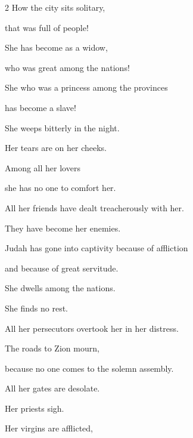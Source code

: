 




\vspace{-1.36in}

\begin{multicols}{2}
	\raggedcolumns
	\mychapter{} \myverse*{}How the city sits solitary,
	
	that was full of people!
	
	She has become as a widow,
	
	who was great among the nations!
	
	She who was a princess among the provinces
	
	has become a slave!
	\vspace{\baselineskip}
	
	\myverse{}She weeps bitterly in the night.
	
	Her tears are on her cheeks.
	
	Among all her lovers
	
	she has no one to comfort her.
	
	All her friends have dealt treacherously with her.
	
	They have become her enemies.
	\vspace{\baselineskip}
	
	\myverse{}Judah has gone into captivity because of affliction
	
	and because of great servitude.
	
	She dwells among the nations.
	
	She finds no rest.
	
	All her persecutors overtook her in her distress.
	\vspace{\baselineskip}
	
	\myverse{}The roads to Zion mourn,
	
	because no one comes to the solemn assembly.
	
	All her gates are desolate.
	
	Her priests sigh.
	
	Her virgins are afflicted,
	

\end{multicols}
